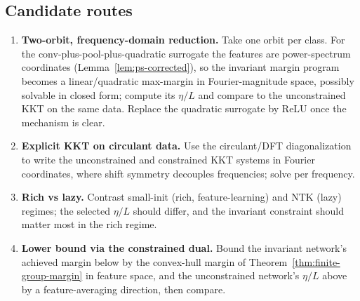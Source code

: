 \documentclass[11pt]{article}
\theoremstyle{plain}
\theoremstyle{definition}
\theoremstyle{remark}
\begin{document}
\subsection{Candidate routes}
\begin{enumerate}[leftmargin=1.4em]
\item \textbf{Two-orbit, frequency-domain reduction.}  Take one orbit per class.  For the conv-plus-pool-plus-quadratic surrogate the features are power-spectrum coordinates (Lemma~\ref{lem:ps-corrected}), so the invariant margin program becomes a linear/quadratic max-margin in Fourier-magnitude space, possibly solvable in closed form; compute its $\eta/L$ and compare to the unconstrained KKT on the same data.  Replace the quadratic surrogate by ReLU once the mechanism is clear.
\item \textbf{Explicit KKT on circulant data.}  Use the circulant/DFT diagonalization to write the unconstrained and constrained KKT systems in Fourier coordinates, where shift symmetry decouples frequencies; solve per frequency.
\item \textbf{Rich vs lazy.}  Contrast small-init (rich, feature-learning) and NTK (lazy) regimes; the selected $\eta/L$ should differ, and the invariant constraint should matter most in the rich regime.
\item \textbf{Lower bound via the constrained dual.}  Bound the invariant network's achieved margin below by the convex-hull margin of Theorem~\ref{thm:finite-group-margin} in feature space, and the unconstrained network's $\eta/L$ above by a feature-averaging direction, then compare.
\end{enumerate}
\end{document}
